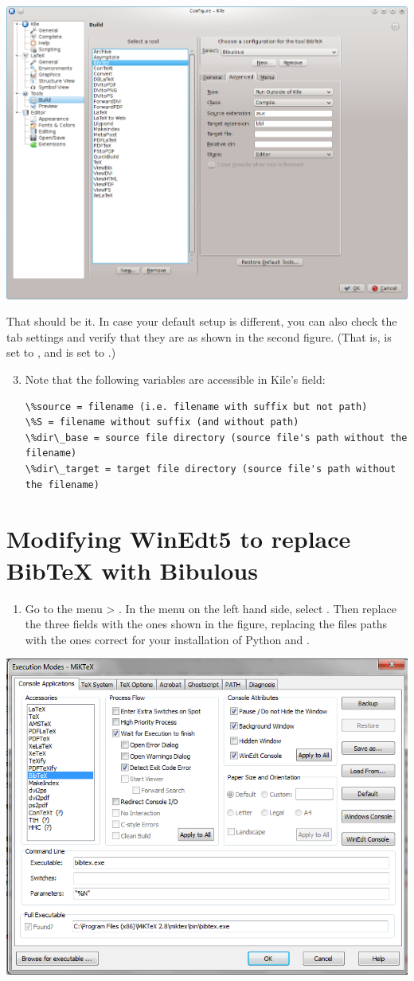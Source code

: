\documentclass[letterpaper,10pt,english]{sphinxmanual}
\begin{document}
\includegraphics[width=0.490\linewidth]{screenshot_for_kile_instructions2.png}

That should be it. In case your default setup is different, you can also check the  tab settings and verify that they are as shown in the second figure. (That is,  is set to , and  is set to .)
\begin{enumerate}
\setcounter{enumi}{2}
\item {} 
Note that the following variables are accessible in Kile's  field:

\begin{Verbatim}[commandchars=\\\{\}]
\%source = filename (i.e. filename with suffix but not path)
\%S = filename without suffix (and without path)
\%dir\_base = source file directory (source file's path without the filename)
\%dir\_target = target file directory (source file's path without the filename)
\end{Verbatim}

\end{enumerate}


\section{Modifying WinEdt5 to replace BibTeX with Bibulous}
\label{getting_started:modifying-winedt5-to-replace-bibtex-with-bibulous}\begin{enumerate}
\item {} 
Go to the menu  \textgreater{} . In the  menu on the left hand side, select . Then replace the three  fields with the ones shown in the figure, replacing the files paths with the ones correct for your installation of Python and .

\end{enumerate}

\includegraphics[width=0.490\linewidth]{original_Winedt5_setup.png}
\end{document}
